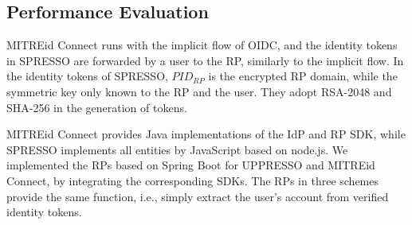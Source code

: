 \subsection{Performance Evaluation}
\label{sec:evaluation}




MITREid Connect runs with the implicit flow of OIDC,
 and the identity tokens in SPRESSO are forwarded by a user to the RP,
    similarly to the implicit flow. %
In the identity tokens of SPRESSO, $PID_{RP}$ is the encrypted RP domain, while the symmetric key only known to the RP and the user.
They adopt RSA-2048 and SHA-256  in the generation of tokens.


MITREid Connect provides Java implementations of the IdP and
RP SDK,
 while SPRESSO implements all entities by JavaScript based on node.js.
We implemented the RPs based on Spring Boot for UPPRESSO and MITREid Connect, by integrating the corresponding SDKs.
The RPs in three schemes provide the same function, i.e.,
     simply extract the user's account from verified identity tokens.

